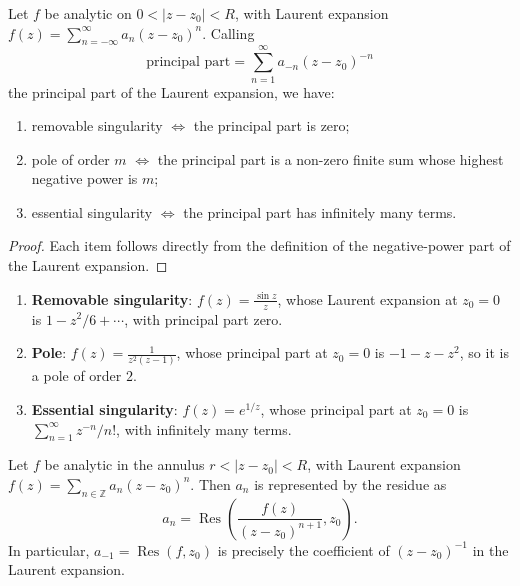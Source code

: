 \begin{proposition}\label{prop:laurent_singularity}
Let $f$ be analytic on $0 < |z-z_0| < R$, with Laurent expansion $f(z) = \sum_{n=-\infty}^{\infty} a_n (z-z_0)^n$. Calling
\[
\text{principal part} = \sum_{n=1}^{\infty} a_{-n} (z-z_0)^{-n}
\]
the principal part of the Laurent expansion, we have:
\begin{enumerate}[label=(\roman*)]
  \item removable singularity $\iff$ the principal part is zero;
  \item pole of order $m$ $\iff$ the principal part is a non-zero finite sum whose highest negative power is $m$;
  \item essential singularity $\iff$ the principal part has infinitely many terms.
\end{enumerate}
\end{proposition}

\begin{proof}
Each item follows directly from the definition of the negative-power part of the Laurent expansion.
\end{proof}

\begin{example}\label{ex:three_singularity_types}
\begin{enumerate}[label=(\roman*)]
  \item \textbf{Removable singularity}: $f(z) = \frac{\sin z}{z}$, whose Laurent expansion at $z_0 = 0$ is $1 - z^2/6 + \cdots$, with principal part zero.
  \item \textbf{Pole}: $f(z) = \frac{1}{z^2(z-1)}$, whose principal part at $z_0 = 0$ is $-1 - z - z^2$, so it is a pole of order $2$.
  \item \textbf{Essential singularity}: $f(z) = e^{1/z}$, whose principal part at $z_0 = 0$ is $\sum_{n=1}^{\infty} z^{-n}/n!$, with infinitely many terms.
\end{enumerate}
\end{example}

\begin{theorem}\label{thm:residue_fourier_duality}
Let $f$ be analytic in the annulus $r < |z - z_0| < R$, with Laurent expansion $f(z) = \sum_{n \in \mathbb{Z}} a_n (z-z_0)^n$. Then $a_n$ is represented by the residue as
\[
a_n = \operatorname{Res}\!\left(\frac{f(z)}{(z-z_0)^{n+1}}, z_0\right).
\]
In particular, $a_{-1} = \operatorname{Res}(f, z_0)$ is precisely the coefficient of $(z-z_0)^{-1}$ in the Laurent expansion.
\end{theorem}


